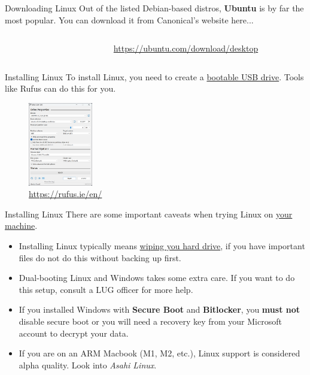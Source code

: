 \documentclass{beamer}
\begin{document}
\begin{frame}{Downloading Linux}
	Out of the listed Debian-based distros, \textbf{Ubuntu} is by far the
	most popular. You can download it from Canonical's website here...
	\begin{columns}
		\begin{column}{0.5\textwidth}
			\begin{figure}
				\centering
				
			\end{figure}
		\end{column}
		\begin{column}{0.5\textwidth}
			\begin{figure}
				\centering
				
				\caption{\url{https://ubuntu.com/download/desktop}}
			\end{figure}
		\end{column}
	\end{columns}
\end{frame}

\begin{frame}{Installing Linux}
	To install Linux, you need to create a \underline{bootable USB drive}.
	Tools like Rufus can do this for you.

	\begin{figure}
		\centering
		\includegraphics[width=0.25\textwidth]{rufus.png}
		\caption{\url{https://rufus.ie/en/}}
	\end{figure}
\end{frame}

\begin{frame}{Installing Linux}
	There are some important caveats when trying Linux on \underline{your
	machine}.
	\pause
	\begin{itemize}
		\item Installing Linux typically means \underline{wiping you
			hard drive}, if you have important files do not do
			this without backing up first.
			\pause
		\item Dual-booting Linux and Windows takes some extra care. If
			you want to do this setup, consult a LUG officer for
			more help.
			\pause
		\item If you installed Windows with \textbf{Secure Boot} and
			\textbf{Bitlocker}, you \textbf{must not} disable
			secure boot or you will need a recovery key from your
			Microsoft account to decrypt your data.
			\pause
		\item If you are on an ARM Macbook (M1, M2, etc.), Linux
			support is considered alpha quality. Look into
			\textit{Asahi Linux}.
	\end{itemize}
\end{frame}
\end{document}
